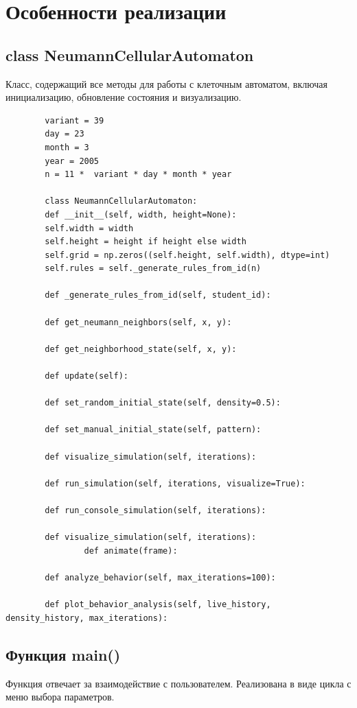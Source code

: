 \documentclass[11pt,a4paper,final]{article}
\begin{document}
	
	\newpage
	\section{Особенности реализации}
	
	\subsection{class NeumannCellularAutomaton}
	Класс, содержащий все методы для работы с клеточным автоматом, включая инициализацию, обновление состояния и визуализацию.
	
	\begin{verbatim}
		variant = 39
		day = 23
		month = 3
		year = 2005
		n = 11 *  variant * day * month * year
		
		class NeumannCellularAutomaton:
		def __init__(self, width, height=None):
		self.width = width
		self.height = height if height else width
		self.grid = np.zeros((self.height, self.width), dtype=int)
		self.rules = self._generate_rules_from_id(n)
		
		def _generate_rules_from_id(self, student_id):

		def get_neumann_neighbors(self, x, y):
		
		def get_neighborhood_state(self, x, y):

		def update(self):

		def set_random_initial_state(self, density=0.5):

		def set_manual_initial_state(self, pattern):

		def visualize_simulation(self, iterations):
		
		def run_simulation(self, iterations, visualize=True):
		
		def run_console_simulation(self, iterations):
		
		def visualize_simulation(self, iterations):
				def animate(frame):

		def analyze_behavior(self, max_iterations=100):
		
		def plot_behavior_analysis(self, live_history, density_history, max_iterations):

	\end{verbatim}
	
	\subsection{Функция main()}
	Функция отвечает за взаимодействие с пользователем. Реализована в виде цикла с меню выбора параметров.
	
\end{document}
